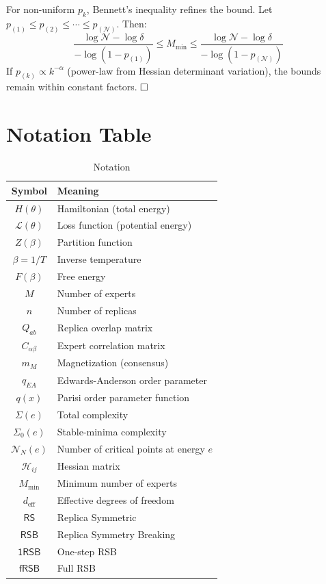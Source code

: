 \documentclass[12pt,a4paper]{article}
\newcommand{\loss}{\mathcal{L}}
\newcommand{\RS}{\mathsf{RS}}
\newcommand{\RSB}{\mathsf{RSB}}
\newcommand{\oneRSB}{\mathsf{1RSB}}
\newcommand{\fRSB}{\mathsf{fRSB}}
\begin{document}
For non-uniform \(p_k\), Bennett's inequality refines the bound. Let \(p_{(1)} \leq p_{(2)} \leq \cdots \leq p_{(\mathcal{N})}\). Then:
\begin{equation}
\frac{\log \mathcal{N} - \log \delta}{-\log(1 - p_{(1)})} \leq M_{\min} \leq \frac{\log \mathcal{N} - \log \delta}{-\log(1 - p_{(\mathcal{N})})}
\end{equation}
If \(p_{(k)} \propto k^{-\alpha}\) (power-law from Hessian determinant variation), the bounds remain within constant factors. \(\hfill \square\)

\section{Notation Table}
\begin{table}[H]
\centering
\caption{Notation}
\label{tab:notation}
\begin{tabular}{cl}
\toprule
Symbol & Meaning \\
\midrule
\(H(\theta)\) & Hamiltonian (total energy) \\
\(\loss(\theta)\) & Loss function (potential energy) \\
\(Z(\beta)\) & Partition function \\
\(\beta = 1/T\) & Inverse temperature \\
\(F(\beta)\) & Free energy \\
\(M\) & Number of experts \\
\(n\) & Number of replicas \\
\(Q_{ab}\) & Replica overlap matrix \\
\(C_{\alpha\beta}\) & Expert correlation matrix \\
\(m_M\) & Magnetization (consensus) \\
\(q_{EA}\) & Edwards-Anderson order parameter \\
\(q(x)\) & Parisi order parameter function \\
\(\Sigma(e)\) & Total complexity \\
\(\Sigma_0(e)\) & Stable-minima complexity \\
\(\mathcal{N}_N(e)\) & Number of critical points at energy \(e\) \\
\(\mathcal{H}_{ij}\) & Hessian matrix \\
\(M_{\min}\) & Minimum number of experts \\
\(d_{\text{eff}}\) & Effective degrees of freedom \\
\(\RS\) & Replica Symmetric \\
\(\RSB\) & Replica Symmetry Breaking \\
\(\oneRSB\) & One-step RSB \\
\(\fRSB\) & Full RSB \\
\bottomrule
\end{tabular}
\end{table}
\end{document}
